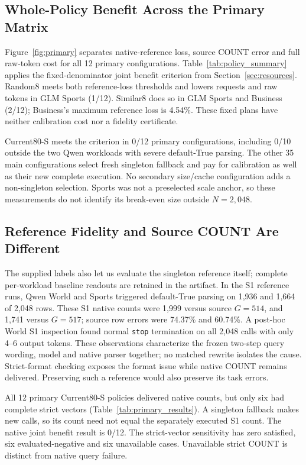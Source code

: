 \subsection{Whole-Policy Benefit Across the Primary Matrix}
\label{sec:bill_results}
Figure~\ref{fig:primary} separates native-reference loss, source COUNT error and full raw-token cost for all 12 primary configurations. Table~\ref{tab:policy_summary} applies the fixed-denominator joint benefit criterion from Section~\ref{sec:resources}. Random8 meets both reference-loss thresholds and lowers requests and raw tokens in GLM Sports (1/12). Similar8 does so in GLM Sports and Business (2/12); Business's maximum reference loss is 4.54\%. These fixed plans have neither calibration cost nor a fidelity certificate.




Current80-S meets the criterion in 0/12 primary configurations, including 0/10 outside the two Qwen workloads with severe default-True parsing. The other 35 main configurations select fresh singleton fallback and pay for calibration as well as their new complete execution. No secondary size/cache configuration adds a non-singleton selection. Sports was not a preselected scale anchor, so these measurements do not identify its break-even size outside $N=2,048$.

\subsection{Reference Fidelity and Source COUNT Are Different}
\label{sec:quality_results}
The supplied labels also let us evaluate the singleton reference itself; complete per-workload baseline readouts are retained in the artifact. In the S1 reference runs, Qwen World and Sports triggered default-True parsing on 1,936 and 1,664 of 2,048 rows. These S1 native counts were 1,999 versus source $G=514$, and 1,741 versus $G=517$; source row errors were 74.37\% and 60.74\%. A post-hoc World S1 inspection found normal \texttt{stop} termination on all 2,048 calls with only 4--6 output tokens. These observations characterize the frozen two-step query wording, model and native parser together; no matched rewrite isolates the cause. Strict-format checking exposes the format issue while native COUNT remains delivered. Preserving such a reference would also preserve its task errors.



All 12 primary Current80-S policies delivered native counts, but only six had complete strict vectors (Table~\ref{tab:primary_results}). A singleton fallback makes new calls, so its count need not equal the separately executed S1 count. The native joint benefit result is 0/12. The strict-vector sensitivity has zero satisfied, six evaluated-negative and six unavailable cases. Unavailable strict COUNT is distinct from native query failure.

